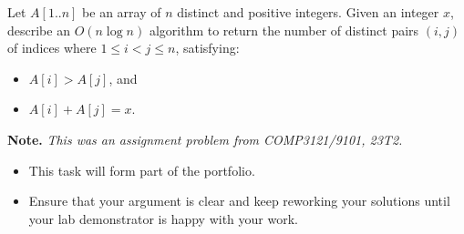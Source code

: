 \documentclass{article}
\begin{document}
\begin{question}
Let $A[1..n]$ be an array of $n$ distinct and positive integers. Given an integer $x$, describe an $O(n \log n)$ algorithm to return the number of distinct pairs $(i, j)$ of indices where $1 \leq i < j \leq n$, satisfying:
\begin{itemize}
    \item $A[i] > A[j]$, and
    \item $A[i] + A[j] = x$.
\end{itemize}

{\bfseries Note.} {\em This was an assignment problem from COMP3121/9101, 23T2.}
\end{question}

\begin{rubric}
\begin{itemize}
    \item This task will form part of the portfolio.
    \item Ensure that your argument is clear and keep reworking your solutions until your lab demonstrator is happy with your work.
\end{itemize}
\end{rubric}
\end{document}
